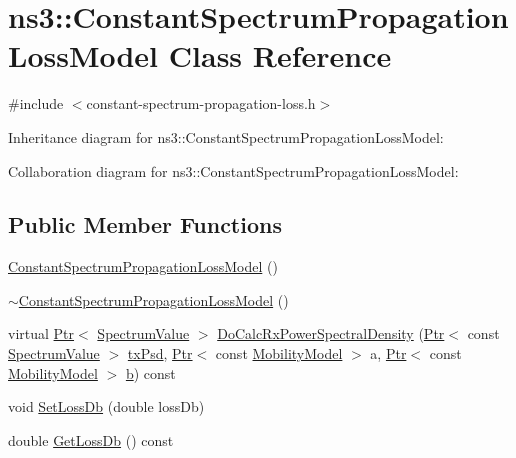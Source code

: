 \hypertarget{classns3_1_1ConstantSpectrumPropagationLossModel}{}\section{ns3\+:\+:Constant\+Spectrum\+Propagation\+Loss\+Model Class Reference}
\label{classns3_1_1ConstantSpectrumPropagationLossModel}


{\ttfamily \#include $<$constant-\/spectrum-\/propagation-\/loss.\+h$>$}



Inheritance diagram for ns3\+:\+:Constant\+Spectrum\+Propagation\+Loss\+Model\+:


Collaboration diagram for ns3\+:\+:Constant\+Spectrum\+Propagation\+Loss\+Model\+:
\subsection*{Public Member Functions}
\begin{DoxyCompactItemize}
\item 
\hyperlink{classns3_1_1ConstantSpectrumPropagationLossModel_abf91819da9544754f119d53af0ec141c}{Constant\+Spectrum\+Propagation\+Loss\+Model} ()
\item 
\hyperlink{classns3_1_1ConstantSpectrumPropagationLossModel_ab4af343f7bcf57f1f9287a17d7238f7b}{$\sim$\+Constant\+Spectrum\+Propagation\+Loss\+Model} ()
\item 
virtual \hyperlink{classns3_1_1Ptr}{Ptr}$<$ \hyperlink{classns3_1_1SpectrumValue}{Spectrum\+Value} $>$ \hyperlink{classns3_1_1ConstantSpectrumPropagationLossModel_aa0649277b5b9319bc5f7d699bd2d2a6e}{Do\+Calc\+Rx\+Power\+Spectral\+Density} (\hyperlink{classns3_1_1Ptr}{Ptr}$<$ const \hyperlink{classns3_1_1SpectrumValue}{Spectrum\+Value} $>$ \hyperlink{lte__link__budget__x2__handover__measures_8m_a684fe3101a5e48a5fcc57cab8dbcd1aa}{tx\+Psd}, \hyperlink{classns3_1_1Ptr}{Ptr}$<$ const \hyperlink{classns3_1_1MobilityModel}{Mobility\+Model} $>$ a, \hyperlink{classns3_1_1Ptr}{Ptr}$<$ const \hyperlink{classns3_1_1MobilityModel}{Mobility\+Model} $>$ \hyperlink{lte__pathloss_8m_a21ad0bd836b90d08f4cf640b4c298e7c}{b}) const 
\item 
void \hyperlink{classns3_1_1ConstantSpectrumPropagationLossModel_a4cbfc8d27b269c7b54c661354f1b9c6e}{Set\+Loss\+Db} (double loss\+Db)
\item 
double \hyperlink{classns3_1_1ConstantSpectrumPropagationLossModel_a9ef7790bcd53fe96c1150297b6404c16}{Get\+Loss\+Db} () const 
\end{DoxyCompactItemize}
